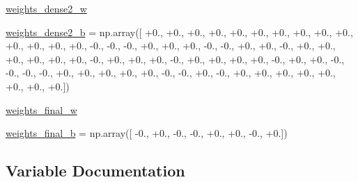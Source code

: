 \begin{DoxyCompactItemize}
\item 
\hyperlink{namespacepybullet-gym_1_1pybulletgym_1_1tests_1_1roboschool_1_1agents_1_1_ant_py_bullet_env__v0__2017may_aa4964acc4ba04878ce93bfbe592950df}{weights\+\_\+dense2\+\_\+w}
\item 
\hyperlink{namespacepybullet-gym_1_1pybulletgym_1_1tests_1_1roboschool_1_1agents_1_1_ant_py_bullet_env__v0__2017may_a16a3b418618fb9fc96064ccf254888fc}{weights\+\_\+dense2\+\_\+b} = np.\+array(\mbox{[} +0., +0., +0., +0., +0., +0., +0., +0., +0., +0., +0., +0., +0., +0., -\/0., -\/0., -\/0., +0., +0., +0., -\/0., -\/0., +0., +0., -\/0., +0., +0., +0., +0., +0., +0., -\/0., +0., +0., +0., -\/0., +0., +0., +0., +0., -\/0., +0., +0., -\/0., -\/0., -\/0., -\/0., +0., +0., +0., +0., +0., -\/0., -\/0., +0., -\/0., +0., +0., +0., +0., +0., +0., +0., +0.\mbox{]})
\item 
\hyperlink{namespacepybullet-gym_1_1pybulletgym_1_1tests_1_1roboschool_1_1agents_1_1_ant_py_bullet_env__v0__2017may_ae8cbcbd2883b6533e9c319e5d71db4c8}{weights\+\_\+final\+\_\+w}
\item 
\hyperlink{namespacepybullet-gym_1_1pybulletgym_1_1tests_1_1roboschool_1_1agents_1_1_ant_py_bullet_env__v0__2017may_a6f7c7cf448f8ef66be8c381d700f55ba}{weights\+\_\+final\+\_\+b} = np.\+array(\mbox{[} -\/0., +0., -\/0., -\/0., +0., +0., -\/0., +0.\mbox{]})
\end{DoxyCompactItemize}


\subsection{Variable Documentation}
